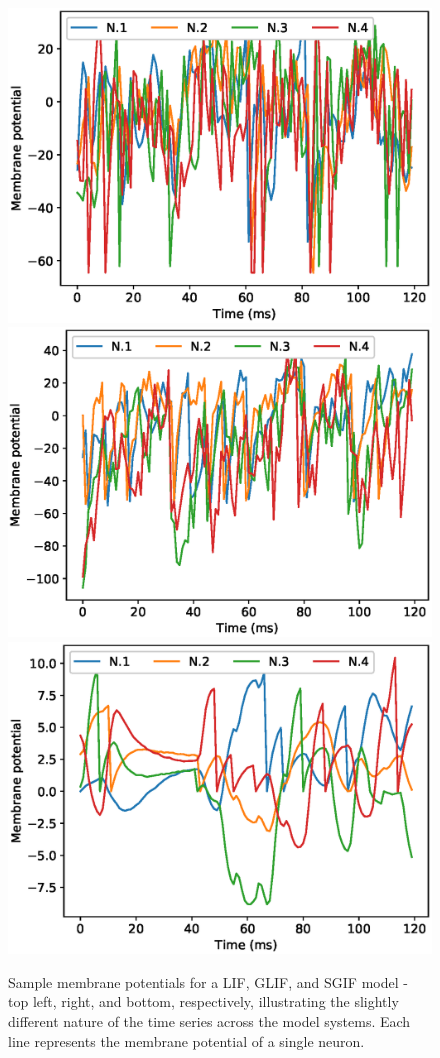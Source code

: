 \documentclass[mphil,deptreport,ianc]{infthesis} %
\begin{document}
\begin{figure}
    \centering
    \includegraphics[width=0.7\linewidth]{figures/samples/membrane_potentials/export_sample_LIF_white_noise.eps}
    \includegraphics[width=0.7\linewidth]{figures/samples/membrane_potentials/export_sample_GLIF_white_noise.eps}
    \includegraphics[width=0.7\linewidth]{figures/samples/membrane_potentials/export_sample_mesoGIF_white_noise.eps}
    \caption{Sample membrane potentials for a LIF, GLIF, and SGIF model - top left, right, and bottom, respectively, illustrating the slightly different nature of the time series across the model systems. Each line represents the membrane potential of a single neuron.}
    \label{fig:membrane_potential_samples}
    \vskip -0.2in
\end{figure}
\end{document}
